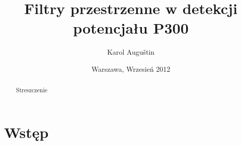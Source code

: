 \documentclass[licencjacka,openright]{pracamgr}
\author{ Karol Auguštin }
\title{ Filtry przestrzenne w detekcji potencjału P300 }
\date{Warszawa, Wrzesień 2012}
\begin{document}
\let\cleardoublepage\clearpage
\maketitle
\begin{abstract}
\par Streszczenie
\end{abstract}
\tableofcontents
\chapter{Wstęp}






\end{document}
